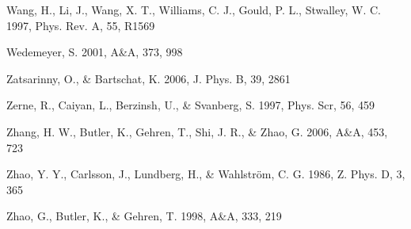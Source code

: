 \documentclass[traditabstract]{aa}
\begin{document}
\begin{thebibliography}{}
  Wang, H., Li, J., Wang, X. T., Williams, C. J., Gould, P. L., Stwalley, W. C. 1997, Phys. Rev. A, 55, R1569

  Wedemeyer, S. 2001, A\&A, 373, 998

  Zatsarinny, O., \& Bartschat, K. 2006, J. Phys. B, 39, 2861

  Zerne, R., Caiyan, L., Berzinsh, U., \& Svanberg, S. 1997, Phys. Scr, 56, 459

  Zhang, H. W., Butler, K., Gehren, T., Shi, J. R., \& Zhao, G. 2006, A\&A, 453, 723

  Zhao, Y. Y., Carlsson, J., Lundberg, H., \& Wahlstr\"om, C. G. 1986, Z. Phys. D, 3, 365

  Zhao, G., Butler, K., \& Gehren, T. 1998, A\&A, 333, 219

\end{thebibliography}


\Online
\onecolumn

\setcounter{table}{0}
\end{document}
